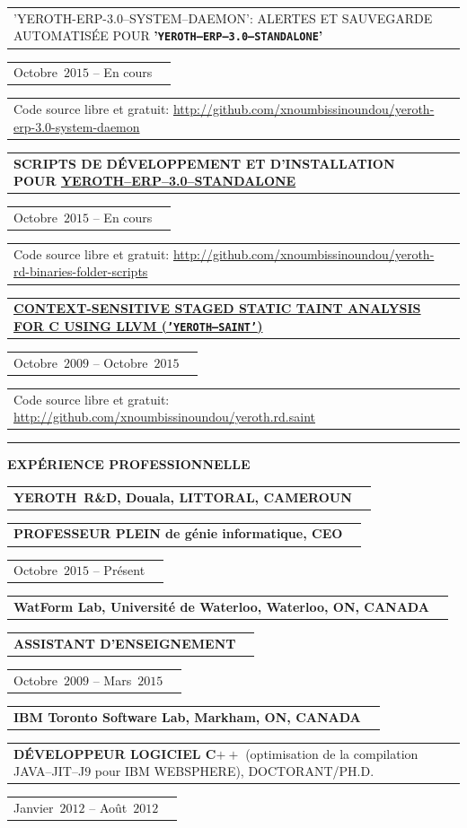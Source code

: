 \documentclass[9pt,a4paper]{article} %
\makeatletter
\newcommand{\yerothrd}{YEROTH~R\&D\xspace}
\newcommand{\headerrow}[2]
{\begin{tabular*}{\linewidth}{l@{\extracolsep{\fill}}r}
	#1 &
	#2 \\
\end{tabular*}}
\newcommand{\headerrowONE}[1]{\headerrow{#1}{}}
\newcommand{\cplusplus}{C$++$\xspace}
\newcommand{\cvitemdate}[2]{#1~$#2$\xspace}
\newcommand{\cvitempositionheld}[1]{\textbf{#1}\xspace}
\makeatother
\begin{document}
\vspace{0.3em}

\headerrowONE{'YEROTH-ERP-3.0--SYSTEM--DAEMON': ALERTES ET SAUVEGARDE AUTOMATISÉE
  POUR \textbf{'\texttt{YEROTH--ERP--3.0--STANDALONE}'}}
  \headerrowONE{\cvitemdate{Octobre}{2015} -- En cours}
\headerrowONE{Code source libre et gratuit: \url{http://github.com/xnoumbissinoundou/yeroth-erp-3.0-system-daemon}}

\vspace{0.3em}

\headerrowONE{\textbf{SCRIPTS DE DÉVELOPPEMENT ET D'INSTALLATION
  POUR 
  \href{http://github.com/xnoumbissinoundou/yeroth-erp-3.0}{\textbf{YEROTH--ERP--3.0--STANDALONE}}}}
  \headerrowONE{\cvitemdate{Octobre}{2015} -- En cours}
\headerrowONE{Code source libre et gratuit: \url{http://github.com/xnoumbissinoundou/yeroth-rd-binaries-folder-scripts}}

\vspace{0.3em}

\headerrowONE{\href{http://archive.org/download/saint_201507/saint.pdf}{\textbf{CONTEXT-SENSITIVE STAGED STATIC TAINT ANALYSIS FOR C USING LLVM (\texttt{'YEROTH--SAINT'})}}}
\headerrowONE{\cvitemdate{Octobre}{2009} -- \cvitemdate{Octobre}{2015}}
\headerrowONE{Code source libre et gratuit: \url{http://github.com/xnoumbissinoundou/yeroth.rd.saint}}
	
	
\vspace{1em}


\hrule
\begin{center}
{\large \textbf{EXPÉRIENCE PROFESSIONNELLE}}
\end{center}

\vspace{0.5em}

\headerrowONE{\textbf{\yerothrd, Douala, LITTORAL, CAMEROUN}}
\headerrowONE{\cvitempositionheld{PROFESSEUR PLEIN de génie informatique, CEO}}
\headerrowONE{\cvitemdate{Octobre}{2015} -- Présent}	

\vspace{0.3em}

\headerrowONE{\textbf{WatForm Lab, Université de Waterloo, Waterloo, ON, CANADA}}	
\headerrowONE{\cvitempositionheld{ASSISTANT D'ENSEIGNEMENT}}
\headerrowONE{\cvitemdate{Octobre}{2009} -- \cvitemdate{Mars}{2015}}
	
\vspace{0.3em}

\headerrowONE{\textbf{IBM Toronto Software Lab, Markham, ON, CANADA}}	
\headerrowONE{\cvitempositionheld{DÉVELOPPEUR LOGICIEL \cplusplus} (optimisation de la compilation JAVA--JIT--J$9$
	pour IBM WEBSPHERE), DOCTORANT/PH.D.}
\headerrowONE{\cvitemdate{Janvier}{2012} -- \cvitemdate{Août}{2012}}	
\end{document}

